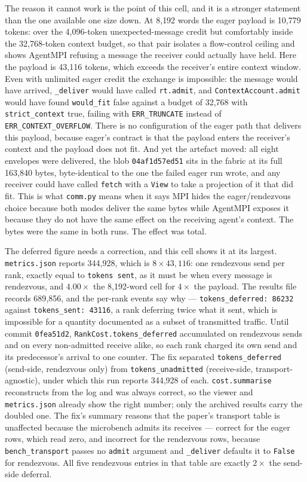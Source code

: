 \documentclass[11pt]{article}
\begin{document}
The reason it cannot work is the point of this cell, and it is a stronger statement
than the one available one size down. At 8{,}192 words the eager payload is 10{,}779
tokens: over the 4{,}096-token unexpected-message credit but comfortably inside the
32{,}768-token context budget, so that pair isolates a flow-control ceiling and shows
AgentMPI refusing a message the receiver could actually have held. Here the payload
is 43{,}116 tokens, which exceeds the receiver's entire context window. Even with
unlimited eager credit the exchange is impossible: the message would have arrived,
\texttt{\_deliver} would have called \texttt{rt.admit}, and
\texttt{ContextAccount.admit} would have found \texttt{would\_fit} false against a
budget of 32{,}768 with \texttt{strict\_context} true, failing with
\texttt{ERR\_TRUNCATE} instead of \texttt{ERR\_CONTEXT\_OVERFLOW}. There is no
configuration of the eager path that delivers this payload, because eager's contract
is that the payload enters the receiver's context and the payload does not fit. And
yet the artefact moved: all eight envelopes were delivered, the blob
\texttt{04af1d57ed51} sits in the fabric at its full 163{,}840 bytes, byte-identical
to the one the failed eager run wrote, and any receiver could have called
\texttt{fetch} with a \texttt{View} to take a projection of it that did fit. This is
what \texttt{comm.py} means when it says MPI hides the eager/rendezvous choice because
both modes deliver the same bytes while AgentMPI exposes it because they do not have
the same effect on the receiving agent's context. The bytes were the same in both runs.
The effect was total.

The deferred figure needs a correction, and this cell shows it at its largest.
\texttt{metrics.json} reports 344{,}928, which is $8 \times 43{,}116$: one rendezvous
send per rank, exactly equal to \texttt{tokens sent}, as it must be when every message
is rendezvous, and $4.00\times$ the 8{,}192-word cell for $4\times$ the payload. The
results file records 689{,}856, and the per-rank events say why ---
\texttt{tokens\_deferred: 86232} against \texttt{tokens\_sent: 43116}, a rank
deferring twice what it sent, which is impossible for a quantity documented as a
subset of transmitted traffic. Until commit \texttt{0fea51d2},
\texttt{RankCost.tokens\_deferred} accumulated on rendezvous sends and on every
non-admitted receive alike, so each rank charged its own send and its predecessor's
arrival to one counter. The fix separated \texttt{tokens\_deferred} (send-side,
rendezvous only) from \texttt{tokens\_unadmitted} (receive-side, transport-agnostic),
under which this run reports 344{,}928 of each. \texttt{cost.summarise} reconstructs
from the log and was always correct, so the viewer and \texttt{metrics.json} already
show the right number; only the archived results carry the doubled one. The fix's
summary reasons that the paper's transport table is unaffected because the microbench
admits its receives --- correct for the eager rows, which read zero, and incorrect for
the rendezvous rows, because \texttt{bench\_transport} passes no \texttt{admit}
argument and \texttt{\_deliver} defaults it to \texttt{False} for rendezvous. All five
rendezvous entries in that table are exactly $2\times$ the send-side deferral.
\end{document}
